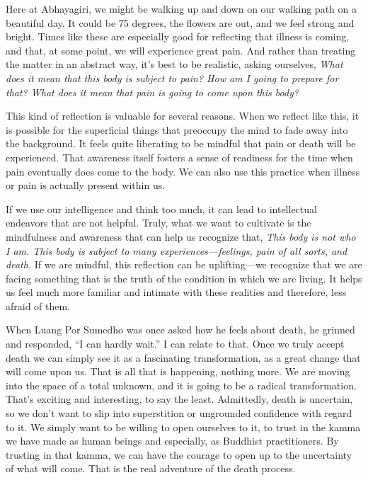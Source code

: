 Here at Abhayagiri, we might be walking up and down on our walking path 
on a beautiful day. It could be 75 degrees, the flowers are out, and we 
feel strong and bright. Times like these are especially good for 
reflecting that illness is coming, and that, at some point, we will 
experience great pain. And rather than treating the matter in an 
abstract way, it's best to be realistic, asking ourselves, \emph{What 
does it mean that this body is subject to pain? How am I going to 
prepare for that? What does it mean that pain is going to come upon 
this body?}

This kind of reflection is valuable for several reasons. When we 
reflect like this, it is possible for the superficial things that 
preoccupy the mind to fade away into the background. It feels quite 
liberating to be mindful that pain or death will be experienced. That 
awareness itself fosters a sense of readiness for the time when pain 
eventually does come to the body. We can also use this practice when 
illness or pain is actually present within us.

If we use our intelligence and think too much, it can lead to 
intellectual endeavors that are not helpful. Truly, what we want to 
cultivate is the mindfulness and awareness that can help us recognize 
that, \emph{This body is not who I am. This body is subject to many 
experiences---feelings, pain of all sorts, and death.} If we are 
mindful, this reflection can be uplifting---we recognize that we are 
facing something that is the truth of the condition in which we are 
living. It helps us feel much more familiar and intimate with these 
realities and therefore, less afraid of them.

When Luang Por Sumedho was once asked how he feels about death, he 
grinned and responded, ``I can hardly wait.'' I can relate to that. 
Once we truly accept death we can simply see it as a fascinating 
transformation, as a great change that will come upon us. That is all 
that is happening, nothing more. We are moving into the space of a 
total unknown, and it is going to be a radical transformation. That's 
exciting and interesting, to say the least. Admittedly, death is 
uncertain, so we don't want to slip into superstition or ungrounded 
confidence with regard to it. We simply want to be willing to open 
ourselves to it, to trust in the kamma we have made as human beings and 
especially, as Buddhist practitioners. By trusting in that kamma, we 
can have the courage to open up to the uncertainty of what will come. 
That is the real adventure of the death process.

